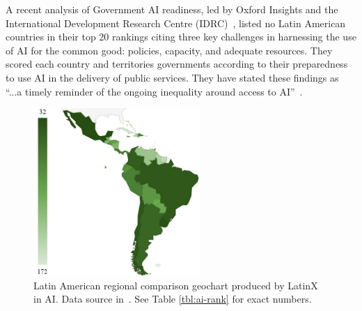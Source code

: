 \documentclass[conference]{IEEEtran}
\begin{document}
A recent analysis of Government AI readiness, led by Oxford Insights and the International Development Research Centre (IDRC)~\cite{miller2019government}, listed no Latin American countries in their top 20 rankings citing three key challenges in harnessing the use of AI for the common good: policies, capacity, and adequate resources. They scored each country and territories governments according to their preparedness to use AI in the delivery of public services. They have stated these findings as ``...a timely reminder of the ongoing inequality around access to AI''~\cite{miller2019government}.

\begin{figure}[!t]
\centering
\includegraphics[width=2.5in]{air-rank-no-table}
\caption{Latin American regional comparison geochart produced by LatinX in AI\texttrademark. Data source in~\cite{miller2019government}. See Table \ref{tbl:ai-rank} for exact numbers.}
\label{fig:ai-rank}
\end{figure}
\end{document}
